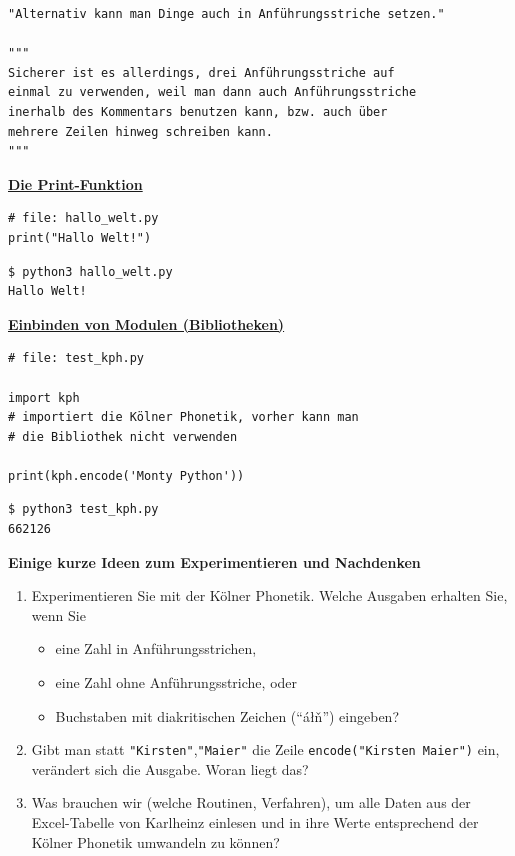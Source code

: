 \begin{verbatim}
"Alternativ kann man Dinge auch in Anführungsstriche setzen."

"""
Sicherer ist es allerdings, drei Anführungsstriche auf
einmal zu verwenden, weil man dann auch Anführungsstriche
inerhalb des Kommentars benutzen kann, bzw. auch über
mehrere Zeilen hinweg schreiben kann.
"""
\end{verbatim}



\par\noindent\textbf{\href{code/hallo_welt.py}{Die Print-Funktion}}

\begin{verbatim}
# file: hallo_welt.py
print("Hallo Welt!")
\end{verbatim}

\begin{verbatim}
$ python3 hallo_welt.py
Hallo Welt!
\end{verbatim}

\par\noindent\textbf{\href{code/test_kph.py}{Einbinden von Modulen (Bibliotheken)}}

\begin{verbatim}
# file: test_kph.py

import kph 
# importiert die Kölner Phonetik, vorher kann man
# die Bibliothek nicht verwenden

print(kph.encode('Monty Python'))
\end{verbatim}

\begin{verbatim}
$ python3 test_kph.py
662126
\end{verbatim}



\par\noindent\textbf{Einige kurze Ideen zum Experimentieren und Nachdenken}

\begin{enumerate}
\itemsep1pt\parskip0pt
\item
  {Experimentieren Sie mit der Kölner Phonetik. Welche Ausgaben erhalten
  Sie, wenn Sie}

  \begin{itemize}
  \itemsep1pt\parskip0pt
  \item
    {eine Zahl in Anführungsstrichen,}
  \item
    {eine Zahl ohne Anführungsstriche, oder}
  \item
    {Buchstaben mit diakritischen Zeichen (``áłň'') eingeben?}
  \end{itemize}
\item
  {Gibt man statt
  \verb|"Kirsten"|,\verb|"Maier"|
  die Zeile \texttt{encode("Kirsten\ Maier")} ein, verändert sich die
  Ausgabe. Woran liegt das?}
\item
  {Was brauchen wir (welche Routinen, Verfahren), um alle Daten aus der
  Excel-Tabelle von Karlheinz einlesen und in ihre Werte entsprechend
  der Kölner Phonetik umwandeln zu können?}
\end{enumerate}


